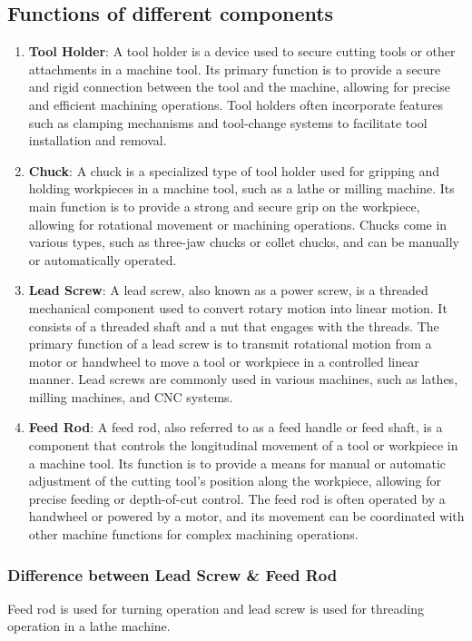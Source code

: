 \documentclass{article}
\begin{document}
\subsection*{Functions of different components}
\begin{enumerate}
  \item \textbf{Tool Holder}: A tool holder is a device used to secure cutting tools or other attachments in a machine tool. Its primary function is to provide a secure and rigid connection between the tool and the machine, allowing for precise and efficient machining operations. Tool holders often incorporate features such as clamping mechanisms and tool-change systems to facilitate tool installation and removal.

  \item \textbf{Chuck}: A chuck is a specialized type of tool holder used for gripping and holding workpieces in a machine tool, such as a lathe or milling machine. Its main function is to provide a strong and secure grip on the workpiece, allowing for rotational movement or machining operations. Chucks come in various types, such as three-jaw chucks or collet chucks, and can be manually or automatically operated.
  
  \item \textbf{Lead Screw}: A lead screw, also known as a power screw, is a threaded mechanical component used to convert rotary motion into linear motion. It consists of a threaded shaft and a nut that engages with the threads. The primary function of a lead screw is to transmit rotational motion from a motor or handwheel to move a tool or workpiece in a controlled linear manner. Lead screws are commonly used in various machines, such as lathes, milling machines, and CNC systems.
  
  \item \textbf{Feed Rod}: A feed rod, also referred to as a feed handle or feed shaft, is a component that controls the longitudinal movement of a tool or workpiece in a machine tool. Its function is to provide a means for manual or automatic adjustment of the cutting tool's position along the workpiece, allowing for precise feeding or depth-of-cut control. The feed rod is often operated by a handwheel or powered by a motor, and its movement can be coordinated with other machine functions for complex machining operations.
\end{enumerate}   

\subsubsection*{Difference between Lead Screw \& Feed Rod}
Feed rod is used for turning operation and lead screw is used for threading operation in a lathe machine.
\end{document}
